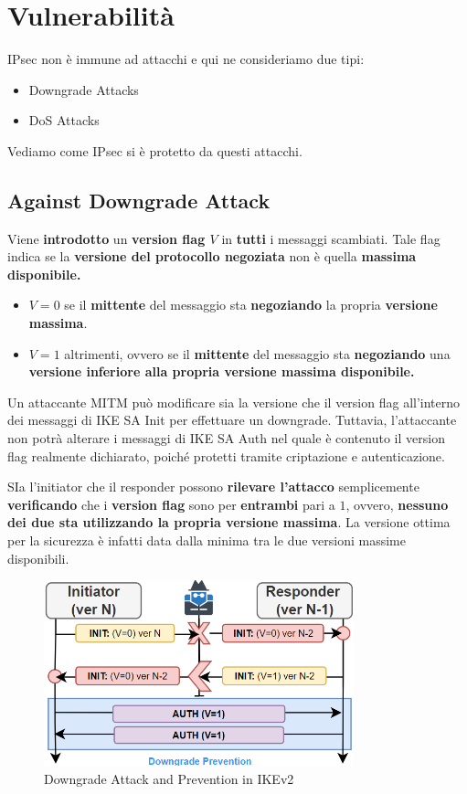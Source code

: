 \section{Vulnerabilità}
IPsec non è immune ad attacchi e qui ne consideriamo due tipi:
\begin{itemize}
    \item Downgrade Attacks
    \item DoS Attacks
\end{itemize}
Vediamo come IPsec si è protetto da questi attacchi.
\subsection{Against Downgrade Attack}
Viene \textbf{introdotto} un \textbf{version flag $V$} in \textbf{tutti} i messaggi scambiati. Tale flag indica se la \textbf{versione del protocollo negoziata} non è quella \textbf{massima disponibile.}
\begin{definition}\label{def:versionflag}
\begin{itemize}
    \item \textbf{$V=0$} se il \textbf{mittente} del messaggio sta \textbf{negoziando} la propria \textbf{versione massima}.
    \item \textbf{$V=1$} altrimenti, ovvero se il \textbf{mittente} del messaggio sta \textbf{negoziando} una \textbf{versione inferiore alla propria versione massima disponibile.}
\end{itemize}
\end{definition}
Un attaccante MITM può modificare sia la versione che il version flag all'interno dei messaggi di IKE SA Init per effettuare un downgrade. Tuttavia, l'attaccante non potrà alterare i messaggi di IKE SA Auth nel quale è contenuto il version flag realmente dichiarato, poiché protetti tramite criptazione e autenticazione.\\
\begin{remark}
SIa l'initiator che il responder possono \textbf{rilevare l'attacco} semplicemente \textbf{verificando} che i \textbf{version flag} sono per \textbf{entrambi} pari a $1$, ovvero, \textbf{nessuno dei due sta utilizzando la propria versione massima}. La versione ottima per la sicurezza è infatti data dalla minima tra le due versioni massime disponibili.
\end{remark}
\begin{figure}[h]
    \centering
    \includegraphics[width=0.8\textwidth]{image/ikedown.png}
    \caption{Downgrade Attack and Prevention in IKEv2}
    \label{fig:ikedown}
\end{figure}\pagebreak

